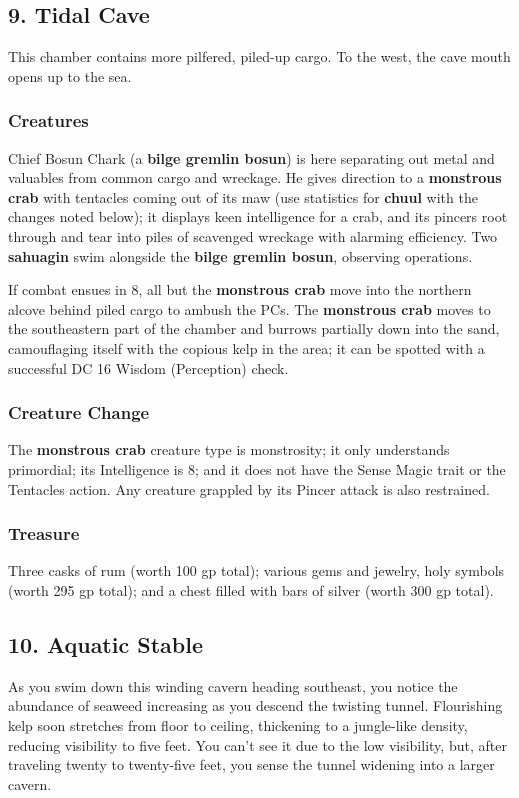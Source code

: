 \documentclass[10pt,a4paper,twoside,bg=print,twocolumn,openany,nodeprecatedcode]{dndbook}
\begin{document}
\subsection{9. Tidal Cave}
\begin{DndReadAloud}{}
This chamber contains more pilfered, piled-up cargo. To the west, the cave mouth opens up to the sea.

\end{DndReadAloud}

\subsubsection{Creatures}
Chief Bosun Chark (a \textbf{bilge gremlin bosun}) is here separating out metal and valuables from common cargo and wreckage. He gives direction to a \textbf{monstrous crab} with tentacles coming out of its maw (use statistics for \textbf{chuul} with the changes noted below); it displays keen intelligence for a crab, and its pincers root through and tear into piles of scavenged wreckage with alarming efficiency. Two \textbf{sahuagin} swim alongside the \textbf{bilge gremlin bosun}, observing operations.

If combat ensues in 8, all but the \textbf{monstrous crab} move into the northern alcove behind piled cargo to ambush the PCs. The \textbf{monstrous crab} moves to the southeastern part of the chamber and burrows partially down into the sand, camouflaging itself with the copious kelp in the area; it can be spotted with a successful DC 16 Wisdom (Perception) check.

\subsubsection{Creature Change}
The \textbf{monstrous crab} creature type is monstrosity; it only understands primordial; its Intelligence is 8; and it does not have the Sense Magic trait or the Tentacles action. Any creature grappled by its Pincer attack is also restrained.

\subsubsection{Treasure}
Three casks of rum (worth 100 gp total); various gems and jewelry, holy symbols (worth 295 gp total); and a chest filled with bars of silver (worth 300 gp total).

\subsection{10. Aquatic Stable}
\begin{DndReadAloud}{}
As you swim down this winding cavern heading southeast, you notice the abundance of seaweed increasing as you descend the twisting tunnel. Flourishing kelp soon stretches from floor to ceiling, thickening to a jungle-like density, reducing visibility to five feet. You can't see it due to the low visibility, but, after traveling twenty to twenty-five feet, you sense the tunnel widening into a larger cavern.

\end{DndReadAloud}
\end{document}
